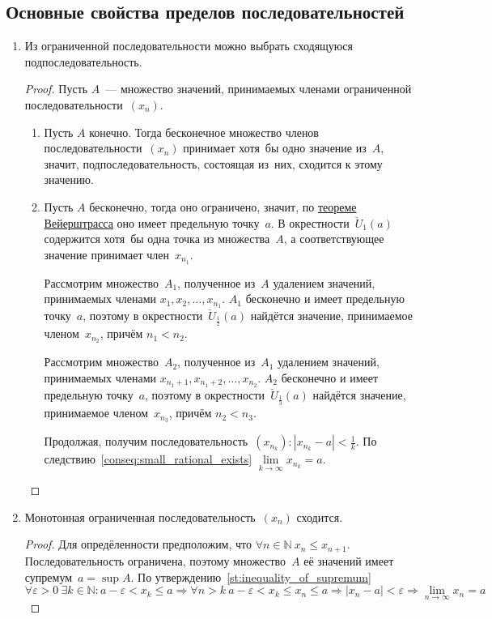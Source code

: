 \subsection{Основные свойства пределов последовательностей}
\begin{enumerate}
	\item Из ограниченной последовательности можно выбрать сходящуюся подпоследовательность.
	\begin{proof}
	Пусть $A$~--- множество значений, принимаемых членами ограниченной последовательности~$(x_n)$.
	\begin{enumerate}
		\item Пусть $A$ конечно.
		Тогда бесконечное множество членов последовательности~$(x_n)$ принимает хотя~бы одно значение из~$A$, значит, подпоследовательность, состоящая из~них, сходится к этому значению.
		
		\item Пусть $A$ бесконечно, тогда оно ограничено, значит, по \hyperref[th:Weierstrass]{теореме Вейерштрасса} оно имеет предельную точку~$a$.
		В окрестности~$\breve U_1(a)$ содержится хотя~бы одна точка из множества~$A$, а соответствующее значение принимает член~$x_{n_1}$.
		
		Рассмотрим множество~$A_1$, полученное из~$A$ удалением значений, принимаемых членами $x_1, x_2, \ldots, x_{n_1}$.
		$A_1$ бесконечно и имеет предельную точку~$a$, поэтому в окрестности~$\breve U_\frac12(a)$ найдётся значение, принимаемое членом~$x_{n_2}$, причём $n_1 < n_2$.
		
		Рассмотрим множество~$A_2$, полученное из~$A_1$ удалением значений, принимаемых членами $x_{n_1 + 1}, x_{n_1 + 2}, \allowbreak \ldots, x_{n_2}$.
		$A_2$ бесконечно и имеет предельную точку~$a$, поэтому в окрестности~$\breve U_\frac13(a)$ найдётся значение, принимаемое членом~$x_{n_3}$, причём $n_2 < n_3$.
		
		Продолжая, получим последовательность~$(x_{n_k}) \colon |x_{n_k} - a| < \frac1k$. По следствию~\ref{conseq:small_rational_exists} $\lim\limits_{k \to \infty} x_{n_k} = a$.
	\end{enumerate}
	\end{proof}
	
	\item \label{st:monotonic_bounded_sequence} Монотонная ограниченная последовательность~$(x_n)$ сходится.
	\begin{proof}
	Для опредёленности предположим, что $\forall n \in \mathbb N \ x_n \leqslant x_{n+1}$.
	Последовательность ограничена, поэтому множество~$A$ её значений имеет супремум~$a = \sup A$.
	По утверждению~\ref{st:inequality_of_supremum}
	\begin{equation*}
	\forall \varepsilon > 0 \ \exists k \in \mathbb N \colon a - \varepsilon < x_k \leqslant a \Rightarrow
	\forall n > k \ a - \varepsilon < x_k \leqslant x_n \leqslant a \Rightarrow
	|x_n - a| < \varepsilon \Rightarrow \lim_{n \to \infty} x_n = a
	\end{equation*}
	\end{proof}
	

\end{enumerate}
